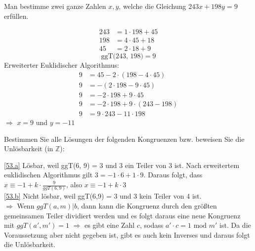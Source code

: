 \documentclass[a4paper, margins=2.5cm]{homework}
\newcommand{\Z}{\mathbb{Z}}
\begin{document}
\begin{problem}
	Man bestimme zwei ganze Zahlen $x,y$, welche die Gleichung
	$243x +198y = 9$ erfüllen.
\end{problem}
\begin{solution}
	\begin{align*}
		243 &= 1 \cdot 198 + 45 \\
		198 &= 4 \cdot 45 + 18 \\
		45 &= 2 \cdot 18 + 9
	\end{align*}
	\[ \text{ggT(243, 198)} = 9 \]
	Erweiterter Euklidischer Algorithmus:
	\begin{align*}
		9 &= 45 - 2 \cdot (198 - 4 \cdot 45) \\
		9 &= -(2 \cdot 198 - 9 \cdot 45) \\
		9 &= -2 \cdot 198 + 9 \cdot 45 \\
		9 &= -2 \cdot 198 + 9 \cdot (243-198) \\
		9 &= 9 \cdot 243 - 11 \cdot 198
	\end{align*}
	$\Longrightarrow$ $x=9$ und $y=-11$
\end{solution}

\begin{problem}
	Bestimmen Sie alle Lösungen der folgenden Kongruenzen bzw. beweisen Sie die
	Unlösbarkeit (in $\Z$):
\end{problem}
\begin{solution}
	\ref{53.a}
	Lösbar, weil ggT(6, 9) = 3 und 3 ein Teiler von 3 ist.
	Nach erweitertem euklidischen Algorithmus gilt $3=-1 \cdot 6 + 1 \cdot 9$.
	Daraus folgt, dass $x \equiv -1 + k \cdot \frac{9}{ggT(6,9)}$, also
	$x \equiv -1 + k \cdot 3$ \\

	\ref{53.b}
	Nicht lösbar, weil ggT(6,9) = 3 und 3 kein Teiler von 4 ist. \\
	$\Longrightarrow$ Wenn $ggT(a,m)|b$, dann kann die Kongruenz durch den größten
	gemeinsamen Teiler dividiert werden und es folgt daraus eine neue Kongruenz
	mit $ggT(a',m')=1$
	$\Longrightarrow$ es gibt eine Zahl $c$, sodass $a' \cdot c = 1 \text{ mod } m'$
	ist. Da die Voraussetzung aber nicht gegeben ist, gibt es auch kein Inverses
	und daraus folgt die Unlösbarkeit.
\end{solution}
\end{document}

